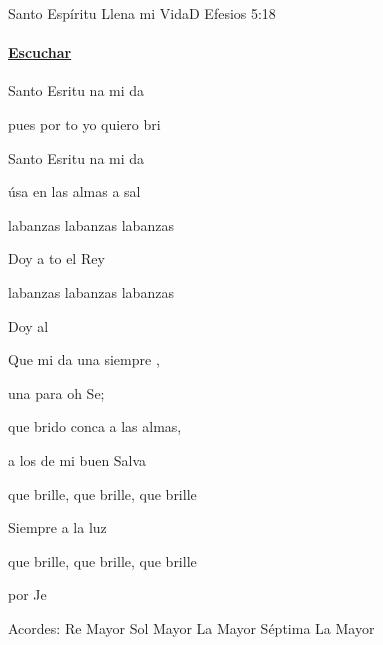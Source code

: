 \documentclass[12pt, spanish]{book}
\begin{document}
    \begin{song}{Santo Espíritu Llena mi Vida}{D}
        {} %
        {}
        {Efesios 5:18} %
        {} %
        \ifChordBk
        \paragraph{\mbox{}\hfill\protect\href{https://open.spotify.com/intl-es/track/5dPxFbvXtjdWmzgrhUq9j0}{Escuchar}\mbox{}\hfill}
        \fi

        \begin{SBOpGroup}
            Santo Esritu na mi da

            pues por to yo quiero bri

            Santo Esritu na mi da

            úsa en las almas a sal
        \end{SBOpGroup}

        \begin{SBChorus}
            labanzas labanzas labanzas

            Doy a to el Rey

            labanzas labanzas labanzas

            Doy al 
        \end{SBChorus}

        \begin{SBOpGroup}
            Que mi da una  siempre ,

            una para oh Se;

            que brido conca a las almas,

            a los  de mi buen Salva
        \end{SBOpGroup}

        \begin{SBChorus}
             que brille,  que brille,  que brille

            Siempre a la luz

             que brille,  que brille,  que brille

            por Je
        \end{SBChorus}

        \ifChordBk
        \begin{SBOpGroup}
            Acordes:
            \upchord{\D}\qquad Re Mayor \hfill
            \upchord{\G}\qquad Sol Mayor \hfill\null\break
            \upchord{\Aseven}\qquad La Mayor S\'eptima \hfill
            \upchord{\A}\qquad La Mayor \hfill\null\break
        \end{SBOpGroup}
        \fi
    \end{song}
\end{document}
